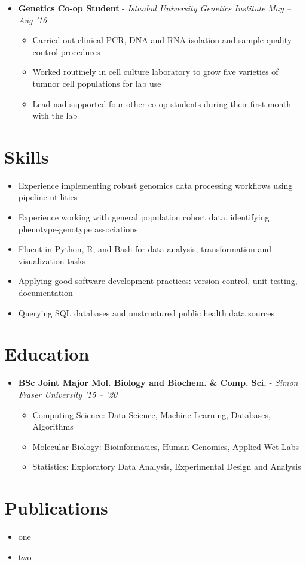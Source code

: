 \documentclass{article}
\newcommand{\experienceheader}[3]{\item \textbf{#1} - \textit{#2} \hfill \textit{#3} \vspace{-.2em}}
\newcommand{\customsection}[1]{\section*{#1} \vspace{-1em} \hrulefill \vspace{-.5em}}
\begin{document}
\begin{itemize}
\begin{itemize}
    \end{itemize}
  \experienceheader{Genetics Co-op Student}{Istanbul University Genetics Institute}{May -- Aug '16}
    \begin{itemize}
      \item Carried out clinical PCR, DNA and RNA isolation and sample quality control procedures
      \item Worked routinely in cell culture laboratory to grow five varieties of tumnor cell populations for lab use
      \item Lead nad supported four other co-op students during their first month with the lab
    \end{itemize}
\end{itemize}

\customsection{Skills}
\begin{itemize}
  \item Experience implementing robust genomics data processing workflows using pipeline utilities
  \item Experience working with general population cohort data, identifying phenotype-genotype associations
  \item Fluent in Python, R, and Bash for data analysis, transformation and visualization tasks
  \item Applying good software development practices: version control, unit testing, documentation
  \item Querying SQL databases and unstructured public health data sources
\end{itemize}

\customsection{Education}
\begin{itemize}
\experienceheader{BSc Joint Major Mol. Biology and Biochem. \& Comp. Sci.}{Simon Fraser University}{'15 -- '20}
  \begin{itemize}
    \item Computing Science: Data Science, Machine Learning, Databases, Algorithms
    \item Molecular Biology: Bioinformatics, Human Genomics, Applied Wet Labs
    \item Statistics: Exploratory Data Analysis, Experimental Design and Analysis
  \end{itemize}
\end{itemize}

\customsection{Publications}
\begin{itemize}
  \item one
  \item two
\end{itemize}
\end{document}
